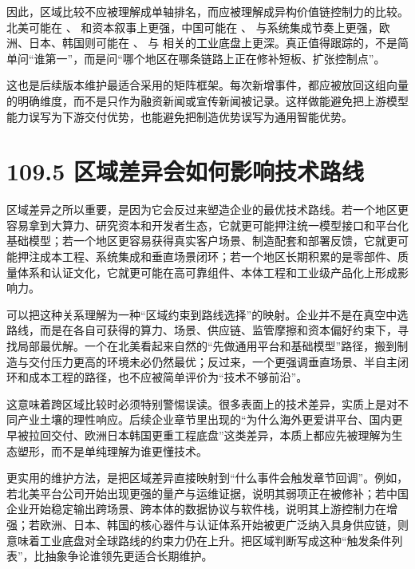 因此，区域比较不应被理解成单轴排名，而应被理解成异构价值链控制力的比较。北美可能在 \texttt{}、\texttt{} 和资本叙事上更强，中国可能在 \texttt{}、\texttt{} 与系统集成节奏上更强，欧洲、日本、韩国则可能在 \texttt{}、\texttt{} 与 \texttt{} 相关的工业底盘上更深。真正值得跟踪的，不是简单问“谁第一”，而是问“哪个地区在哪条链路上正在修补短板、扩张控制点”。

这也是后续版本维护最适合采用的矩阵框架。每次新增事件，都应被放回这组向量的明确维度，而不是只作为融资新闻或宣传新闻被记录。这样做能避免把上游模型能力误写为下游交付优势，也能避免把制造优势误写为通用智能优势。

\section*{109.5 区域差异会如何影响技术路线}


区域差异之所以重要，是因为它会反过来塑造企业的最优技术路线。若一个地区更容易拿到大算力、研究资本和开发者生态，它就更可能押注统一模型接口和平台化基础模型；若一个地区更容易获得真实客户场景、制造配套和部署反馈，它就更可能押注成本工程、系统集成和垂直场景闭环；若一个地区长期积累的是零部件、质量体系和认证文化，它就更可能在高可靠组件、本体工程和工业级产品化上形成影响力。

可以把这种关系理解为一种“区域约束到路线选择”的映射。企业并不是在真空中选路线，而是在各自可获得的算力、场景、供应链、监管摩擦和资本偏好约束下，寻找局部最优解。一个在北美看起来自然的“先做通用平台和基础模型”路径，搬到制造与交付压力更高的环境未必仍然最优；反过来，一个更强调垂直场景、半自主闭环和成本工程的路径，也不应被简单评价为“技术不够前沿”。

这意味着跨区域比较时必须特别警惕误读。很多表面上的技术差异，实质上是对不同产业土壤的理性响应。后续企业章节里出现的“为什么海外更爱讲平台、国内更早被拉回交付、欧洲日本韩国更重工程底盘”这类差异，本质上都应先被理解为生态塑形，而不是单纯理解为谁更懂技术。

更实用的维护方法，是把区域差异直接映射到“什么事件会触发章节回调”。例如，若北美平台公司开始出现更强的量产与运维证据，说明其弱项正在被修补；若中国企业开始稳定输出跨场景、跨本体的数据协议与软件栈，说明其上游控制力在增强；若欧洲、日本、韩国的核心器件与认证体系开始被更广泛纳入具身供应链，则意味着工业底盘对全球路线的约束力仍在上升。把区域判断写成这种“触发条件列表”，比抽象争论谁领先更适合长期维护。

